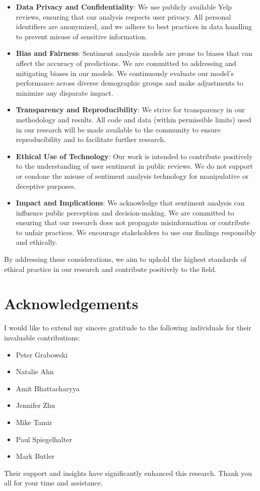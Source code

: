 \documentclass[11pt]{article}
\begin{document}
\begin{itemize}
    \item \textbf{Data Privacy and Confidentiality}: We use publicly available Yelp reviews, ensuring that our analysis respects user privacy. All personal identifiers are anonymized, and we adhere to best practices in data handling to prevent misuse of sensitive information.

    \item \textbf{Bias and Fairness}: Sentiment analysis models are prone to biases that can affect the accuracy of predictions. We are committed to addressing and mitigating biases in our models. We continuously evaluate our model's performance across diverse demographic groups and make adjustments to minimize any disparate impact.
    
    \item \textbf{Transparency and Reproducibility}: We strive for transparency in our methodology and results. All code and data (within permissible limits) used in our research will be made available to the community to ensure reproducibility and to facilitate further research.
    
    \item \textbf{Ethical Use of Technology}: Our work is intended to contribute positively to the understanding of user sentiment in public reviews. We do not support or condone the misuse of sentiment analysis technology for manipulative or deceptive purposes.
    
    \item \textbf{Impact and Implications}: We acknowledge that sentiment analysis can influence public perception and decision-making. We are committed to ensuring that our research does not propagate misinformation or contribute to unfair practices. We encourage stakeholders to use our findings responsibly and ethically.
\end{itemize}

By addressing these considerations, we aim to uphold the highest standards of ethical practice in our research and contribute positively to the field.

\section*{Acknowledgements}
I would like to extend my sincere gratitude to the following individuals for their invaluable contributions:
\begin{itemize}
  \item Peter Grabowski
  \item Natalie Ahn
  \item Amit Bhattacharyya
  \item Jennifer Zhu
  \item Mike Tamir
  \item Paul Spiegelhalter
  \item Mark Butler
\end{itemize}
Their support and insights have significantly enhanced this research. Thank you all for your time and assistance.
\end{document}
